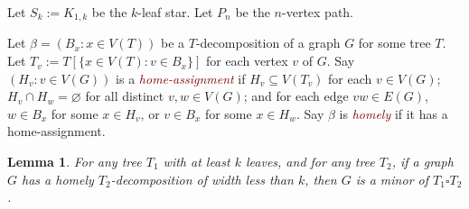 \documentclass[12pt]{article}
\newcommand{\defn}[1]{\textcolor{Maroon}{\emph{#1}}}
\renewcommand{\emptyset}{\varnothing}
\theoremstyle{plain}
\newtheorem{lem}[thm]{Lemma}
\theoremstyle{definition}
\begin{document}


Let $S_k:= K_{1,k}$ be the $k$-leaf star.
Let $P_n$ be the $n$-vertex path.


Let $\beta=(B_x:x\in V(T))$ be a $T$-decomposition
of a graph $G$ for some tree $T$. Let  $T_v:=T[\{x\in V(T):v\in B_x\}]$ for each vertex $v$ of $G$. Say $(H_v:v\in V(G))$ is a \defn{home-assignment} if
$H_v\subseteq V(T_v)$ for each $v\in V(G)$;
$H_v\cap H_w=\emptyset$ for all distinct $v,w\in V(G)$; and for each edge $vw\in E(G)$, $w\in B_x$ for some $x\in H_v$, or $v\in B_x$ for some $x\in H_w$. Say $\beta$ is \defn{homely} if it has a home-assignment.

\begin{lem}
\label{Homely}
For any tree $T_1$ with at least $k$ leaves, and for any tree $T_2$, if a graph $G$ has a homely $T_2$-decomposition of width less than $k$, then $G$ is a minor of $T_1 \square T_2$.
\end{lem}
\end{document}

